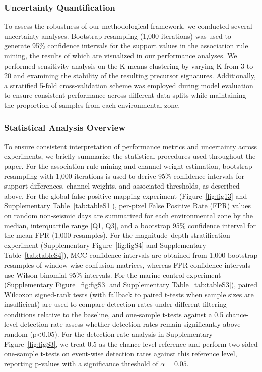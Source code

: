 \documentclass[preprint,review,12pt,authoryear]{elsarticle}
\begin{document}
\subsubsection{Uncertainty Quantification}\label{sec:uncertainty}
To assess the robustness of our methodological framework, we conducted several uncertainty analyses. Bootstrap resampling (1,000 iterations) was used to generate 95\% confidence intervals for the support values in the association rule mining, the results of which are visualized in our performance analyses. We performed sensitivity analysis on the K-means clustering by varying K from 3 to 20 and examining the stability of the resulting precursor signatures. Additionally, a stratified 5-fold cross-validation scheme was employed during model evaluation to ensure consistent performance across different data splits while maintaining the proportion of samples from each environmental zone.

\subsubsection{Statistical Analysis Overview}
To ensure consistent interpretation of performance metrics and uncertainty across experiments, we briefly summarize the statistical procedures used throughout the paper. For the association rule mining and channel-weight estimation, bootstrap resampling with 1,000 iterations is used to derive 95\% confidence intervals for support differences, channel weights, and associated thresholds, as described above. For the global false-positive mapping experiment (Figure~\ref{fig:fig13} and Supplementary Table~\ref{tab:tableS1}), per-pixel False Positive Rate (FPR) values on random non-seismic days are summarized for each environmental zone by the median, interquartile range [Q1, Q3], and a bootstrap 95\% confidence interval for the mean FPR (1,000 resamples). For the magnitude--depth stratification experiment (Supplementary Figure~\ref{fig:figS4} and Supplementary Table~\ref{tab:tableS4}), MCC confidence intervals are obtained from 1,000 bootstrap resamples of window-wise confusion matrices, whereas FPR confidence intervals use Wilson binomial 95\% intervals. For the marine control experiment (Supplementary Figure~\ref{fig:figS3} and Supplementary Table~\ref{tab:tableS3}), paired Wilcoxon signed-rank tests (with fallback to paired t-tests when sample sizes are insufficient) are used to compare detection rates under different filtering conditions relative to the baseline, and one-sample t-tests against a 0.5 chance-level detection rate assess whether detection rates remain significantly above random (p<0.05). For the detection rate analysis in Supplementary Figure~\ref{fig:figS3}, we treat 0.5 as the chance-level reference and perform two-sided one-sample t-tests on event-wise detection rates against this reference level, reporting p-values with a significance threshold of $\alpha = 0.05$.
\end{document}
